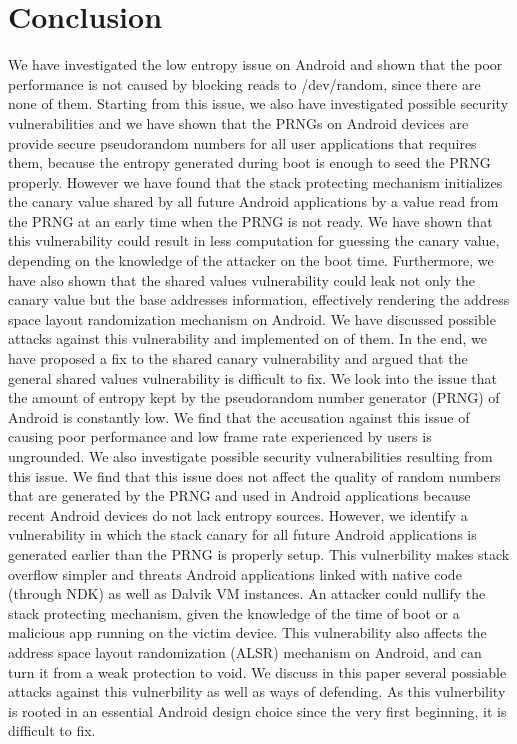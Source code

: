\section{Conclusion}

We have investigated the low entropy issue on Android and shown that the poor performance is not caused by blocking reads to /dev/random, since there are none of them. Starting from this issue, we also have investigated possible security vulnerabilities and we have shown that the PRNGs on Android devices are provide secure pseudorandom numbers for all user applications that requires them, because the entropy generated during boot is enough to seed the PRNG properly. However we have found that the stack protecting mechanism initializes the canary value shared by all future Android applications by a value read from the PRNG at an early time when the PRNG is not ready. We have shown that this vulnerability could result in less computation for guessing the canary value, depending on the knowledge of the attacker on the boot time. Furthermore, we have also shown that the shared values vulnerability could leak not only the canary value but the base addresses information, effectively rendering the address space layout randomization mechanism on Android. We have discussed possible attacks against this vulnerability and implemented on of them. In the end, we have proposed a fix to the shared canary vulnerability and argued that the general shared values vulnerability is difficult to fix.
We look into the issue that the amount of entropy kept by the pseudorandom number generator (PRNG) of Android is constantly low. We find that the accusation against this issue of causing poor performance and low frame rate experienced by users is ungrounded. We also investigate possible security vulnerabilities resulting from this issue. We find that this issue does not affect the quality of random numbers that are generated by the PRNG and used in Android applications because recent Android devices do not lack entropy sources. However, we identify a vulnerability in which the stack canary for all future Android applications is generated earlier than the PRNG is properly setup. This vulnerbility makes stack overflow simpler and threats Android applications linked with native code (through NDK) as well as Dalvik VM instances. An attacker could nullify the stack protecting mechanism, given the knowledge of the time of boot or a malicious app running on the victim device. This vulnerability also affects the address space layout randomization (ALSR) mechanism on Android, and can turn it from a weak protection to void. We discuss in this paper several possiable attacks against this vulnerbility as well as ways of defending. As this vulnerbility is rooted in an essential Android design choice since the very first beginning, it is difficult to fix.

